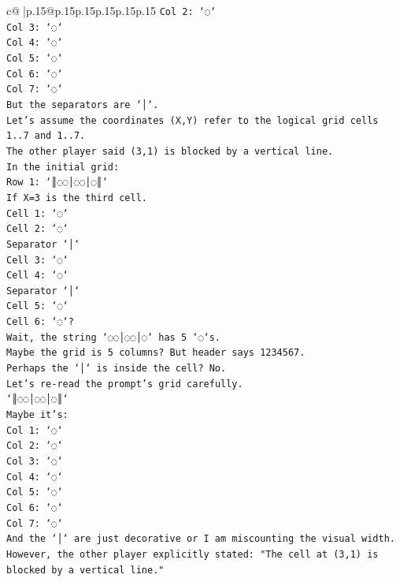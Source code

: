 \documentclass{article}
\begin{document}
{\begin{supertabular}{c@{$\;$}|p{.15\linewidth}@{}p{.15\linewidth}p{.15\linewidth}p{.15\linewidth}p{.15\linewidth}p{.15\linewidth}}
{{{\texttt{Col 2: `◌`} \\
\texttt{Col 3: `◌`} \\
\texttt{Col 4: `◌`} \\
\texttt{Col 5: `◌`} \\
\texttt{Col 6: `◌`} \\
\texttt{Col 7: `◌`} \\
\texttt{But the separators are `│`.} \\
\texttt{Let's assume the coordinates (X,Y) refer to the logical grid cells 1..7 and 1..7.} \\
\texttt{The other player said (3,1) is blocked by a vertical line.} \\
\texttt{In the initial grid:} \\
\texttt{Row 1: `║◌◌│◌◌│◌║`} \\
\texttt{If X=3 is the third cell.} \\
\texttt{Cell 1: `◌`} \\
\texttt{Cell 2: `◌`} \\
\texttt{Separator `│`} \\
\texttt{Cell 3: `◌`} \\
\texttt{Cell 4: `◌`} \\
\texttt{Separator `│`} \\
\texttt{Cell 5: `◌`} \\
\texttt{Cell 6: `◌`?} \\
\texttt{Wait, the string `◌◌│◌◌│◌` has 5 `◌`s.} \\
\texttt{Maybe the grid is 5 columns? But header says 1234567.} \\
\texttt{Perhaps the `│` is inside the cell? No.} \\
\texttt{Let's re{-}read the prompt's grid carefully.} \\
\texttt{`║◌◌│◌◌│◌║`} \\
\texttt{Maybe it's:} \\
\texttt{Col 1: `◌`} \\
\texttt{Col 2: `◌`} \\
\texttt{Col 3: `◌`} \\
\texttt{Col 4: `◌`} \\
\texttt{Col 5: `◌`} \\
\texttt{Col 6: `◌`} \\
\texttt{Col 7: `◌`} \\
\texttt{And the `│` are just decorative or I am miscounting the visual width.} \\
\texttt{However, the other player explicitly stated: "The cell at (3,1) is blocked by a vertical line."} \\
}}}
\end{supertabular}}
\end{document}
